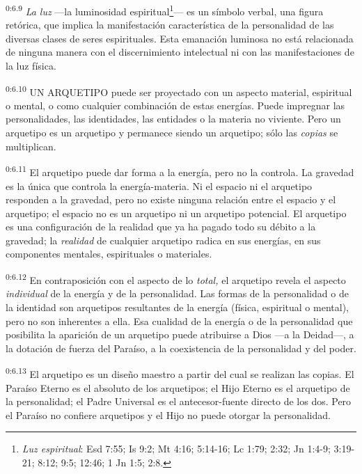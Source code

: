 \par
\textsuperscript{0:6.9} \textit{La luz} ---la luminosidad espiritual\footnote{\textit{Luz espiritual}: Esd 7:55; Is 9:2; Mt 4:16; 5:14-16; Lc 1:79; 2:32; Jn 1:4-9; 3:19-21; 8:12; 9:5; 12:46; 1 Jn 1:5; 2:8.}--- es un símbolo verbal, una figura retórica, que implica la manifestación característica de la personalidad de las diversas clases de seres espirituales. Esta emanación luminosa no está relacionada de ninguna manera con el discernimiento intelectual ni con las manifestaciones de la luz física.

\par
\textsuperscript{0:6.10} UN ARQUETIPO puede ser proyectado con un aspecto material, espiritual o mental, o como cualquier combinación de estas energías. Puede impregnar las personalidades, las identidades, las entidades o la materia no viviente. Pero un arquetipo es un arquetipo y permanece siendo un arquetipo; sólo las \textit{copias} se multiplican.

\par
\textsuperscript{0:6.11} El arquetipo puede dar forma a la energía, pero no la controla. La gravedad es la única que controla la energía-materia. Ni el espacio ni el arquetipo responden a la gravedad, pero no existe ninguna relación entre el espacio y el arquetipo; el espacio no es un arquetipo ni un arquetipo potencial. El arquetipo es una configuración de la realidad que ya ha pagado todo su débito a la gravedad; la \textit{realidad} de cualquier arquetipo radica en sus energías, en sus componentes mentales, espirituales o materiales.

\par
\textsuperscript{0:6.12} En contraposición con el aspecto de lo \textit{total,} el arquetipo revela el aspecto \textit{individual} de la energía y de la personalidad. Las formas de la personalidad o de la identidad son arquetipos resultantes de la energía (física, espiritual o mental), pero no son inherentes a ella. Esa cualidad de la energía o de la personalidad que posibilita la aparición de un arquetipo puede atribuirse a Dios ---a la Deidad---, a la dotación de fuerza del Paraíso, a la coexistencia de la personalidad y del poder.

\par
\textsuperscript{0:6.13} El arquetipo es un diseño maestro a partir del cual se realizan las copias. El Paraíso Eterno es el absoluto de los arquetipos; el Hijo Eterno es el arquetipo de la personalidad; el Padre Universal es el antecesor-fuente directo de los dos. Pero el Paraíso no confiere arquetipos y el Hijo no puede otorgar la personalidad.

